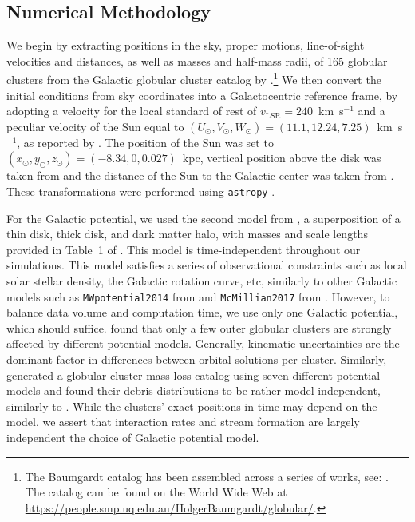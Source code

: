 \documentclass[draft]{aa}
\begin{document}
  \subsection{Numerical Methodology}
    We begin by extracting positions in the sky, proper motions, line-of-sight velocities and distances, as well as masses and half-mass radii, of 165 globular clusters from the Galactic globular cluster catalog by \cite{2021MNRAS.505.5957B}.\footnote{The Baumgardt catalog has been assembled across a series of works, see: \cite{2020PASA...37...46B,2019MNRAS.482.5138B,2018MNRAS.478.1520B}. The catalog can be found on the World Wide Web at \href{https://people.smp.uq.edu.au/HolgerBaumgardt/globular/}{https://people.smp.uq.edu.au/HolgerBaumgardt/globular/}.} We then convert the initial conditions from sky coordinates into a Galactocentric reference frame, by adopting a velocity for the local standard of rest of $v_{\text{LSR}} = 240$~km~s$^{-1}$ and a peculiar velocity of the Sun equal to $(U_\odot, V_\odot, W_\odot)=(11.1, 12.24, 7.25)$~km~s$^{-1}$, as reported by \citet{2012MNRAS.427..274S}.  The position of the Sun was set to $(x_\odot,y_\odot,z_\odot) = (-8.34,0,0.027)$~kpc, vertical position above the disk was taken from \citet{2001ApJ...553..184C} and the distance of the Sun to the Galactic center was taken from \citet{2014ApJ...783..130R}. These transformations were performed using \texttt{astropy} \citep{2013A&A...558A..33A}.

    For the Galactic potential, we used the second model from \citet{2017A&A...598A..66P}, a superposition of a thin disk, thick disk, and dark matter halo, with masses and scale lengths provided in Table~1 of \citet{2023A&A...673A..44F}. This model is time-independent throughout our simulations. This model satisfies a series of observational constraints such as local solar stellar density, the Galactic rotation curve, etc, similarly to other Galactic models such as \texttt{MWpotential2014} from \citet{2015ApJS..216...29B} and \texttt{McMillian2017} from \citet{2017MNRAS.465...76M}. However, to balance data volume and computation time, we use only one Galactic potential, which should suffice. \citet{2021MNRAS.505.5978V} found that only a few outer globular clusters are strongly affected by different potential models. Generally, kinematic uncertainties are the dominant factor in differences between orbital solutions per cluster. Similarly, \citet{2024MNRAS.528.5189G} generated a globular cluster mass-loss catalog using seven different potential models and found their debris distributions to be rather model-independent, similarly to \citet{2023A&A...673A..44F}. While the clusters' exact positions in time may depend on the model, we assert that interaction rates and stream formation are largely independent the choice of Galactic potential model.
    
\end{document}
